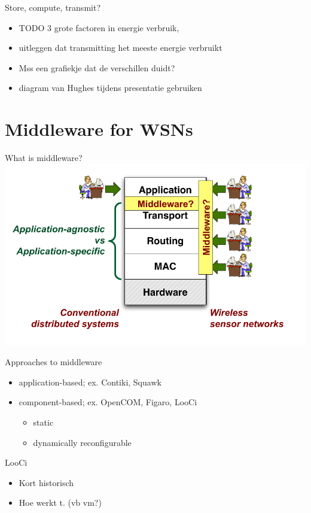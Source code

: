 \documentclass[presentation, bigger]{beamer}
\begin{document}
\begin{frame}[label=sec-1-5]{Store, compute, transmit?}
\begin{itemize}
\item TODO 3 grote factoren in energie verbruik,
\item uitleggen dat transmitting het meeste energie verbruikt
\item Mss een grafiekje dat de verschillen duidt?
\item diagram van Hughes tijdens presentatie gebruiken
\end{itemize}
\end{frame}
\section{Middleware for WSNs}
\label{sec-2}
\begin{frame}[label=sec-2-1]{What is middleware?}
\includegraphics[width=\textwidth,keepaspectration=true]{middleware}
\end{frame}

\begin{frame}[label=sec-2-2]{Approaches to middleware}
\begin{itemize}
\item application-based; ex. Contiki, Squawk
\item component-based; ex. OpenCOM, Figaro, LooCi
\begin{itemize}
\item static
\item dynamically reconfigurable
\end{itemize}
\end{itemize}
\end{frame}

\begin{frame}[label=sec-2-3]{LooCi}
\begin{itemize}
\item Kort historisch
\item Hoe werkt t. (vb vm?)
\end{itemize}
\end{frame}
\end{document}
